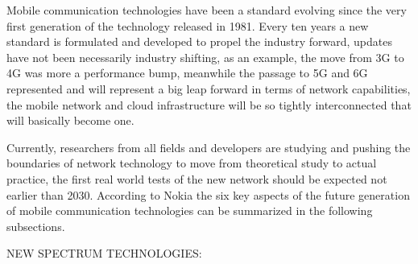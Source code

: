 

Mobile communication technologies have been a standard evolving since the very first
generation of the technology released in 1981. Every ten years a new standard is formulated and
developed to propel the industry forward, updates have not been necessarily industry shifting, as an example, the move from 3G to 4G was more a performance bump,
meanwhile the passage to 5G and 6G represented and will represent a big leap forward in terms of
network capabilities, the mobile network and cloud infrastructure will be so tightly interconnected
that will basically become one.

Currently, researchers from all fields and developers are studying and pushing the boundaries of
network technology to move from theoretical study to actual practice, the first real world tests of
the new network should be expected not earlier than 2030. According to Nokia\cite{nokiabell} the six key aspects of the future generation of mobile communication technologies can be summarized in the following subsections.

\bigskip
\noindent
NEW SPECTRUM TECHNOLOGIES:
\label{ssec:spectrum-technologies}

